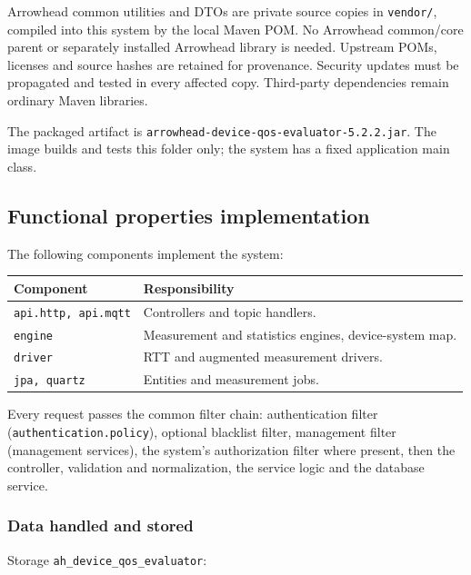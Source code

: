 \documentclass[a4paper]{arrowhead}
\begin{document}
Arrowhead common utilities and DTOs are private source copies in \texttt{vendor/}, compiled into this system by the local Maven POM. No Arrowhead common/core parent or separately installed Arrowhead library is needed. Upstream POMs, licenses and source hashes are retained for provenance. Security updates must be propagated and tested in every affected copy. Third-party dependencies remain ordinary Maven libraries.

The packaged artifact is \texttt{arrowhead-\allowbreak{}device-\allowbreak{}qos-\allowbreak{}evaluator-5.2.2.jar}. The image builds and tests this folder only; the system has a fixed application main class.

\subsection{Functional properties implementation}

The following components implement the system:

\noindent\begin{longtable}{| p{5.6cm} | p{9.6cm} |} \hline
\rowcolor{gray!33} Component & Responsibility \\ \hline \endhead
\texttt{api.\allowbreak{}http,\allowbreak{} api.\allowbreak{}mqtt} & Controllers and topic handlers. \\ \hline
\texttt{engine} & Measurement and statistics engines, device-system map. \\ \hline
\texttt{driver} & RTT and augmented measurement drivers. \\ \hline
\texttt{jpa,\allowbreak{} quartz} & Entities and measurement jobs. \\ \hline
\end{longtable}

Every request passes the common filter chain: authentication filter (\texttt{authentication.\allowbreak{}policy}), optional blacklist filter, management filter (management services), the system's authorization filter where present, then the controller, validation and normalization, the service logic and the database service.

\subsubsection{Data handled and stored}

Storage \texttt{ah\_\allowbreak{}device\_\allowbreak{}qos\_\allowbreak{}evaluator}:
\end{document}
